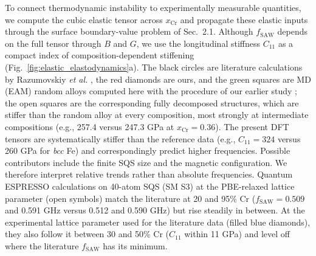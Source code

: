 \documentclass[final,3p,times]{elsarticle}
\begin{document}
To connect thermodynamic instability to experimentally measurable quantities, we compute the cubic elastic tensor across $x_{\mathrm{Cr}}$ and propagate these elastic inputs through the surface boundary-value problem of Sec.~2.1. Although $f_{\mathrm{SAW}}$ depends on the full tensor through $B$ and $G$, we use the longitudinal stiffness $C_{11}$ as a compact index of composition-dependent stiffening (Fig.~\ref{fig:elastic_elastodynamics}a). The black circles are literature calculations by Razumovskiy \textit{et al.} \cite{razumovskiy2011first}, the red diamonds are ours, and the green squares are MD (EAM) random alloys computed here with the procedure of our earlier study \cite{al2023detecting}; the open squares are the corresponding fully decomposed structures, which are stiffer than the random alloy at every composition, most strongly at intermediate compositions (e.g., 257.4 versus 247.3 GPa at $x_{\mathrm{Cr}}=0.36$). The present DFT tensors are systematically stiffer than the reference data (e.g., $C_{11}=324$ versus 260 GPa for \textit{bcc} Fe) and correspondingly predict higher frequencies. Possible contributors include the finite SQS size and the magnetic configuration. We therefore interpret relative trends rather than absolute frequencies. Quantum ESPRESSO calculations on 40-atom SQS (SM S3) at the PBE-relaxed lattice parameter (open symbols) match the literature at 20 and 95\% Cr ($f_{\mathrm{SAW}}=0.509$ and 0.591 GHz versus 0.512 and 0.590 GHz) but rise steadily in between. At the experimental lattice parameter used for the literature data (filled blue diamonds), they also follow it between 30 and 50\% Cr ($C_{11}$ within 11 GPa) and level off where the literature $f_{\mathrm{SAW}}$ has its minimum.
\end{document}

